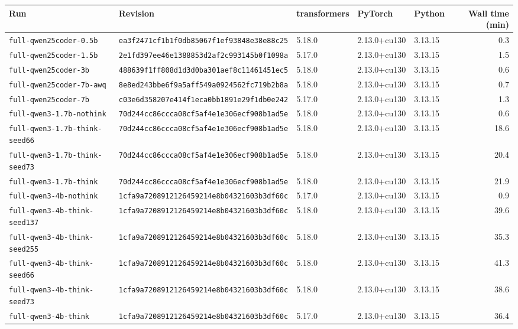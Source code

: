 \begin{tabular}{@{}l l l l l r@{}}
\toprule
Run & Revision & transformers & PyTorch & Python & Wall time (min) \\
\midrule
\texttt{full-qwen25coder-0.5b} & \texttt{ea3f2471cf1b1f0db85067f1ef93848e38e88c25} & 5.18.0 & 2.13.0+cu130 & 3.13.15 & 0.3 \\
\texttt{full-qwen25coder-1.5b} & \texttt{2e1fd397ee46e1388853d2af2c993145b0f1098a} & 5.17.0 & 2.13.0+cu130 & 3.13.15 & 1.5 \\
\texttt{full-qwen25coder-3b} & \texttt{488639f1ff808d1d3d0ba301aef8c11461451ec5} & 5.18.0 & 2.13.0+cu130 & 3.13.15 & 0.6 \\
\texttt{full-qwen25coder-7b-awq} & \texttt{8e8ed243bbe6f9a5aff549a0924562fc719b2b8a} & 5.18.0 & 2.13.0+cu130 & 3.13.15 & 0.7 \\
\texttt{full-qwen25coder-7b} & \texttt{c03e6d358207e414f1eca0bb1891e29f1db0e242} & 5.17.0 & 2.13.0+cu130 & 3.13.15 & 1.3 \\
\texttt{full-qwen3-1.7b-nothink} & \texttt{70d244cc86ccca08cf5af4e1e306ecf908b1ad5e} & 5.18.0 & 2.13.0+cu130 & 3.13.15 & 0.6 \\
\texttt{full-qwen3-1.7b-think-seed66} & \texttt{70d244cc86ccca08cf5af4e1e306ecf908b1ad5e} & 5.18.0 & 2.13.0+cu130 & 3.13.15 & 18.6 \\
\texttt{full-qwen3-1.7b-think-seed73} & \texttt{70d244cc86ccca08cf5af4e1e306ecf908b1ad5e} & 5.18.0 & 2.13.0+cu130 & 3.13.15 & 20.4 \\
\texttt{full-qwen3-1.7b-think} & \texttt{70d244cc86ccca08cf5af4e1e306ecf908b1ad5e} & 5.18.0 & 2.13.0+cu130 & 3.13.15 & 21.9 \\
\texttt{full-qwen3-4b-nothink} & \texttt{1cfa9a7208912126459214e8b04321603b3df60c} & 5.17.0 & 2.13.0+cu130 & 3.13.15 & 0.9 \\
\texttt{full-qwen3-4b-think-seed137} & \texttt{1cfa9a7208912126459214e8b04321603b3df60c} & 5.18.0 & 2.13.0+cu130 & 3.13.15 & 39.6 \\
\texttt{full-qwen3-4b-think-seed255} & \texttt{1cfa9a7208912126459214e8b04321603b3df60c} & 5.18.0 & 2.13.0+cu130 & 3.13.15 & 35.3 \\
\texttt{full-qwen3-4b-think-seed66} & \texttt{1cfa9a7208912126459214e8b04321603b3df60c} & 5.18.0 & 2.13.0+cu130 & 3.13.15 & 41.3 \\
\texttt{full-qwen3-4b-think-seed73} & \texttt{1cfa9a7208912126459214e8b04321603b3df60c} & 5.18.0 & 2.13.0+cu130 & 3.13.15 & 38.6 \\
\texttt{full-qwen3-4b-think} & \texttt{1cfa9a7208912126459214e8b04321603b3df60c} & 5.17.0 & 2.13.0+cu130 & 3.13.15 & 36.4 \\

\end{tabular}
